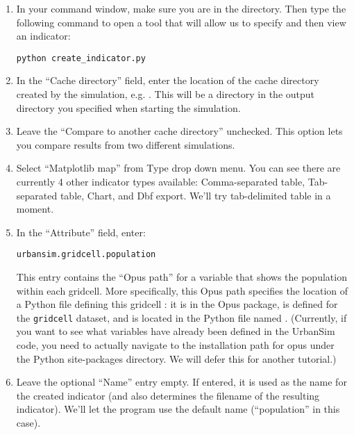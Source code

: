 \documentclass{howto}
\begin{document}
\begin{enumerate}

\item In your command window, make sure you are in the
 directory.  Then type the following command to
open a tool that will allow us to specify and then view an
indicator:

\begin{verbatim}
python create_indicator.py
\end{verbatim}

\item In the ``Cache directory'' field, enter the location of the cache directory
created by the
simulation, e.g. .
This will be a directory in the output directory you specified when
starting the simulation.

\item Leave the ``Compare to another cache directory'' unchecked.  This option lets you 
compare results from two different simulations.

\item Select ``Matplotlib map'' from Type drop down menu. You can see there are currently 4 other
indicator types available: Comma-separated table, Tab-separated table, Chart, and Dbf export. We'll try 
tab-delimited table in a moment.

\item In the ``Attribute'' field, enter:

\begin{verbatim}
urbansim.gridcell.population
\end{verbatim}

This entry contains the ``Opus path'' for a variable that shows the
population within each gridcell.  More specifically, this Opus path specifies
the location of a Python file defining this gridcell : it is
in the  Opus package, is defined for the
\verb|gridcell| dataset, and is located in the Python file named
. (Currently,
if you want to
see what variables have already been defined in the UrbanSim code,
you need to actually navigate to the installation path for opus
under the Python site-packages directory.  We will defer this for
another tutorial.)

\item Leave the optional ``Name'' entry empty. If entered, it is used
as the
name for the created indicator (and also determines the filename of the
resulting indicator). We'll let the program use the default name
(``population'' in this case).


\end{enumerate}
\end{document}
